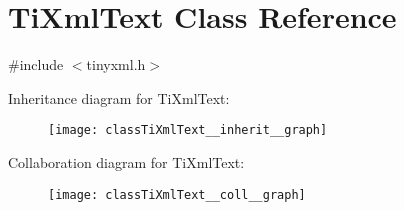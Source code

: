 \hypertarget{classTiXmlText}{}\section{Ti\+Xml\+Text Class Reference}
\label{classTiXmlText}


{\ttfamily \#include $<$tinyxml.\+h$>$}



Inheritance diagram for Ti\+Xml\+Text\+:\nopagebreak
\begin{figure}[H]
\begin{center}
\leavevmode
\texttt{[image: classTiXmlText\_\_inherit\_\_graph]}
\end{center}
\end{figure}


Collaboration diagram for Ti\+Xml\+Text\+:\nopagebreak
\begin{figure}[H]
\begin{center}
\leavevmode
\texttt{[image: classTiXmlText\_\_coll\_\_graph]}
\end{center}
\end{figure}
